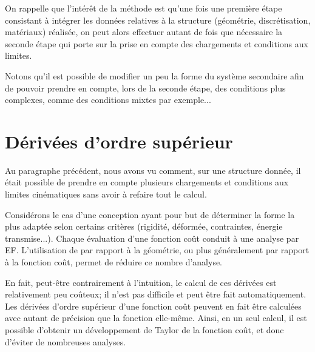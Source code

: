 \bigskip
{}

\medskip
On rappelle que l'intérêt de la méthode est qu'une fois une première étape consistant
à intégrer les données relatives à la structure (géométrie, discrétisation, matériaux)
réalisée, on peut alors effectuer autant de fois que nécessaire la seconde étape qui porte
sur la prise en compte des chargements et conditions aux limites.

Notons qu'il est possible de modifier un peu la forme du système secondaire afin de pouvoir prendre
en compte, lors de la seconde étape, des conditions plus complexes, comme des conditions mixtes
par exemple...


\medskip
\section{Dérivées d'ordre supérieur}\label{Sec-Deriv}
Au paragraphe précédent, nous avons vu comment, sur une structure donnée, il était
possible de prendre en compte plusieurs chargements et conditions aux limites cinématiques
sans avoir à refaire tout le calcul.


\medskip
Considérons le cas d'une conception ayant pour but de déterminer la forme la plus
adaptée selon certains critères (rigidité, déformée, contraintes, énergie
transmise...).
Chaque évaluation d'une fonction coût conduit à une analyse par EF.
L'utilisation de  par rapport à la géométrie, ou plus
généralement par rapport à la fonction coût, permet de réduire ce nombre
d'analyse.

En fait, peut-être contrairement à l'intuition, le calcul de ces dérivées est relativement
peu coûteux; il n'est pas difficile et peut être fait automatiquement. Les dérivées
d'ordre supérieur d'une fonction coût peuvent en fait
être calculées avec autant de précision que la fonction elle-même. Ainsi, en un seul calcul,
il est possible d'obtenir un développement de Taylor de la fonction coût, et donc d'éviter de
nombreuses analyses.

\medskip
